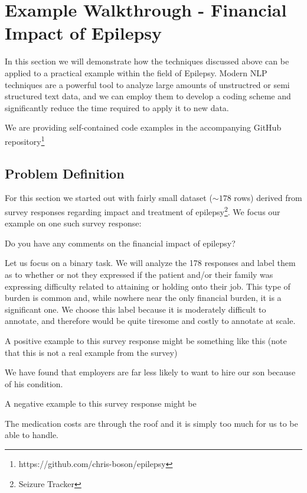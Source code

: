 \section{Example Walkthrough - Financial Impact of Epilepsy}

In this section we will demonstrate how the techniques discussed above can be applied to a practical example within the field of Epilepsy.
Modern NLP techniques are a powerful tool to analyze large amounts of unstructred or semi structured text data, and we can employ them to develop a coding scheme and significantly reduce the time required to apply it to new data.

We are providing self-contained code examples in the accompanying GitHub repository\footnote{https://github.com/chris-boson/epilepsy}


\subsection{Problem Definition}
For this section we started out with fairly small dataset ($\sim178$ rows) derived from survey responses regarding impact and treatment of epilepsy\footnote{Seizure Tracker}.
We focus our example on one such survey response:
\begin{displayquote}
    Do you have any comments on the financial impact of epilepsy?
\end{displayquote}

Let us focus on a binary task. We will analyze the 178 responses and label them as to whether or not they expressed if the patient and/or their family was expressing difficulty related to attaining or holding onto their job. This
type of burden is common and, while nowhere near the only financial burden, it is a significant one. We choose this label because it is moderately difficult to annotate, and therefore would be quite tiresome and costly to annotate at scale.

A positive example to this survey response might be something like this (note that this is not a real example from the survey)
\begin{displayquote}
    We have found that employers are far less likely to want to hire our son because of his condition.
\end{displayquote}

A negative example to this survey response might be
\begin{displayquote}
    The medication costs are through the roof and it is simply too much for us to be able to handle.
\end{displayquote}

